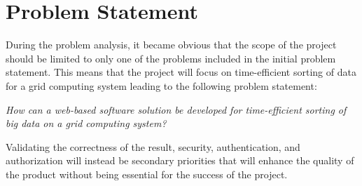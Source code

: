 \section{Problem Statement} \label{sec:problemStatement}
During the problem analysis, it became obvious that the scope of the project should be limited to only one of the problems included in the initial problem statement. This means that the project will focus on time-efficient sorting of data for a grid computing system leading to the following problem statement:

\begin{center}
\emph{How can a web-based software solution be developed for time-efficient sorting of big data on a grid computing system?}
\end{center}

Validating the correctness of the result, security, authentication, and authorization will instead be secondary priorities that will enhance the quality of the product without being essential for the success of the project.